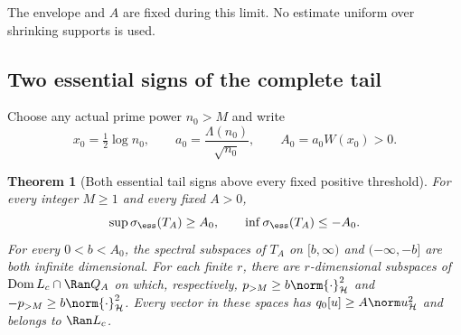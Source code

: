 \documentclass[11pt,a4paper]{article}
\numberwithin{equation}{section}
\newtheorem{theorem}{Theorem}[section]
\theoremstyle{definition}\newtheorem{definition}[theorem]{Definition}
\theoremstyle{remark}\newtheorem{remark}[theorem]{Remark}
\newcommand{\Hh}{\mathcal H}\newcommand{\Hw}{\mathcal H}
\newcommand{\dom}{\operatorname{Dom}}\newcommand{\Var}{\operatorname{Var}}
\begin{document}
The envelope and $A$ are fixed during this limit.  No estimate uniform
over shrinking supports is used.

\subsection{Two essential signs of the complete tail}
\label{vfourA:subsec:essential-signs}

Choose any actual prime power $n_0>M$ and write
\begin{equation}\label{vfourA:eq:packet-constant}
 x_0=\tfrac12\log n_0,\qquad
 a_0=\frac{\Lambda(n_0)}{\sqrt{n_0}},\qquad
 A_0=a_0W(x_0)>0.
\end{equation}

\begin{theorem}[Both essential tail signs above every fixed positive threshold]
\label{vfourA:thm:essential-signs}
For every integer $M\ge1$ and every fixed $A>0$,
\begin{equation}\label{vfourA:eq:essential-edges}
 \sup\sigma_{\ess}(T_A)\ge A_0,\qquad
 \inf\sigma_{\ess}(T_A)\le-A_0.
\end{equation}
For every $0<b<A_0$, the spectral subspaces of $T_A$ on
$[b,\infty)$ and $(-\infty,-b]$ are both infinite dimensional.
For each finite $r$, there are $r$-dimensional subspaces of
$\dom L_c\cap\Ran Q_A$ on which, respectively,
$p_{>M}\ge b\norm{\cdot}_{\Hh}^2$ and
$-p_{>M}\ge b\norm{\cdot}_{\Hh}^2$.
Every vector in these spaces has
$q_0[u]\ge A\norm u_{\Hh}^2$ and belongs to $\Ran L_c$.
\end{theorem}
\end{document}
